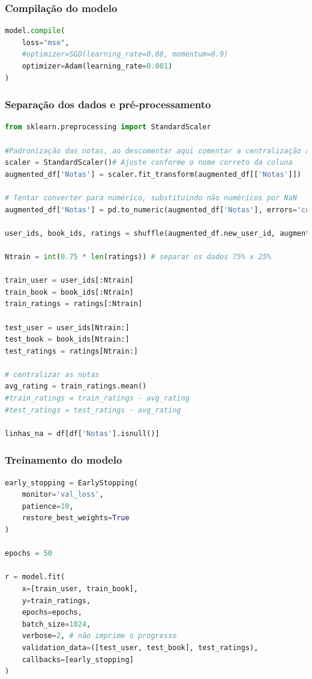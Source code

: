 \subsubsection*{Compilação do modelo}
\begin{lstlisting}[language=Python, style=input]
model.compile(
    loss="mse",
    #optimizer=SGD(learning_rate=0.08, momentum=0.9)
    optimizer=Adam(learning_rate=0.001)
)
\end{lstlisting}

\subsubsection*{Separação dos dados e pré-processamento}
\begin{lstlisting}[language=Python, style=input]
from sklearn.preprocessing import StandardScaler

#Padronização das notas, ao descomentar aqui comentar a centralização abaixo
scaler = StandardScaler()# Ajuste conforme o nome correto da coluna
augmented_df['Notas'] = scaler.fit_transform(augmented_df[['Notas']])

# Tentar converter para numérico, substituindo não numéricos por NaN
augmented_df['Notas'] = pd.to_numeric(augmented_df['Notas'], errors='coerce')

user_ids, book_ids, ratings = shuffle(augmented_df.new_user_id, augmented_df.new_book_id, augmented_df.Notas)

Ntrain = int(0.75 * len(ratings)) # separar os dados 75% x 25%

train_user = user_ids[:Ntrain]
train_book = book_ids[:Ntrain]
train_ratings = ratings[:Ntrain]

test_user = user_ids[Ntrain:]
test_book = book_ids[Ntrain:]
test_ratings = ratings[Ntrain:]

# centralizar as notas
avg_rating = train_ratings.mean()
#train_ratings = train_ratings - avg_rating
#test_ratings = test_ratings - avg_rating

linhas_na = df[df['Notas'].isnull()]
\end{lstlisting}
\subsubsection*{Treinamento do modelo}
\begin{lstlisting}[language=Python, style=input]
early_stopping = EarlyStopping(
    monitor='val_loss',
    patience=10,
    restore_best_weights=True
)

epochs = 50

r = model.fit(
    x=[train_user, train_book],
    y=train_ratings,
    epochs=epochs,
    batch_size=1024,
    verbose=2, # não imprime o progresso
    validation_data=([test_user, test_book], test_ratings),
    callbacks=[early_stopping]
)
\end{lstlisting}
